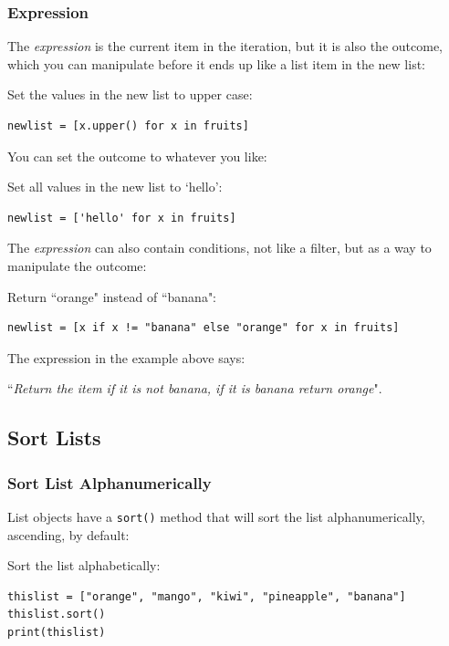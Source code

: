 \documentclass[12pt,a4paper]{article}
\newcommand{\code}[1]{%
	\colorbox{backcolour}{\lstinline{#1}}%
}
\begin{document}
\subsubsection{Expression}

The \textit{expression} is the current item in the iteration, but it is also
the outcome, which you can manipulate before it ends up like a list item in the
new list:

\begin{ebox}
Set the values in the new list to upper case:
	\begin{lstlisting}
newlist = [x.upper() for x in fruits]
	\end{lstlisting}
\end{ebox}

You can set the outcome to whatever you like:

\begin{ebox}
Set all values in the new list to `hello':
	\begin{lstlisting}
newlist = ['hello' for x in fruits]
	\end{lstlisting}
\end{ebox}

The \textit{expression} can also contain conditions, not like a filter, but as
a way to manipulate the outcome:

\begin{ebox}
Return ``orange" instead of ``banana":
	\begin{lstlisting}
newlist = [x if x != "banana" else "orange" for x in fruits]
	\end{lstlisting}
\end{ebox}

The expression in the example above says:

``\textit{Return the item if it is not banana, if it is banana return orange}".
\subsection{Sort Lists}

\subsubsection{Sort List Alphanumerically}

List objects have a \code{sort()} method that will sort the list
alphanumerically, ascending, by default:

\begin{ebox}
Sort the list alphabetically:
	\begin{lstlisting}
thislist = ["orange", "mango", "kiwi", "pineapple", "banana"]
thislist.sort()
print(thislist)
	\end{lstlisting}
\tcblower
	\begin{vercode}
	\end{vercode}
\end{ebox}
\end{document}
